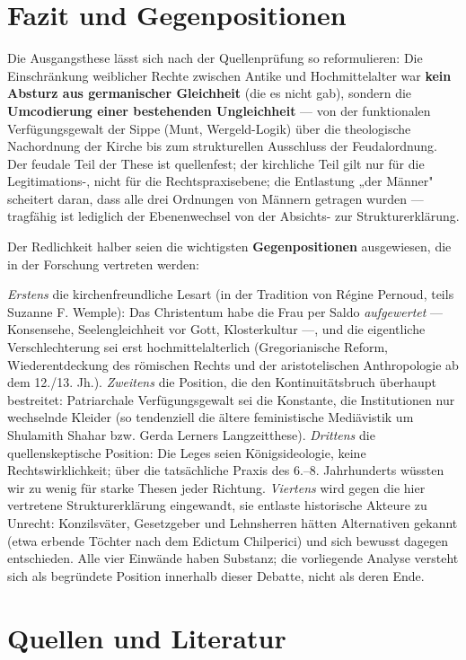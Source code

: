 \documentclass[11pt,a4paper,ngerman]{scrartcl}
\begin{document}
\section{Fazit und Gegenpositionen}

Die Ausgangsthese lässt sich nach der Quellenprüfung so reformulieren: Die Einschränkung weiblicher Rechte zwischen Antike und Hochmittelalter war \textbf{kein Absturz aus germanischer Gleichheit} (die es nicht gab), sondern die \textbf{Umcodierung einer bestehenden Ungleichheit} — von der funktionalen Verfügungsgewalt der Sippe (Munt, Wergeld-Logik) über die theologische Nachordnung der Kirche bis zum strukturellen Ausschluss der Feudalordnung. Der feudale Teil der These ist quellenfest; der kirchliche Teil gilt nur für die Legitimations-, nicht für die Rechtspraxisebene; die Entlastung „der Männer" scheitert daran, dass alle drei Ordnungen von Männern getragen wurden — tragfähig ist lediglich der Ebenenwechsel von der Absichts- zur Strukturerklärung.

Der Redlichkeit halber seien die wichtigsten \textbf{Gegenpositionen} ausgewiesen, die in der Forschung vertreten werden:

\emph{Erstens} die kirchenfreundliche Lesart (in der Tradition von Régine Pernoud, teils Suzanne F. Wemple): Das Christentum habe die Frau per Saldo \emph{aufgewertet} — Konsensehe, Seelengleichheit vor Gott, Klosterkultur —, und die eigentliche Verschlechterung sei erst hochmittelalterlich (Gregorianische Reform, Wiederentdeckung des römischen Rechts und der aristotelischen Anthropologie ab dem 12./13. Jh.). \emph{Zweitens} die Position, die den Kontinuitätsbruch überhaupt bestreitet: Patriarchale Verfügungsgewalt sei die Konstante, die Institutionen nur wechselnde Kleider (so tendenziell die ältere feministische Mediävistik um Shulamith Shahar bzw. Gerda Lerners Langzeitthese). \emph{Drittens} die quellenskeptische Position: Die Leges seien Königsideologie, keine Rechtswirklichkeit; über die tatsächliche Praxis des 6.–8. Jahrhunderts wüssten wir zu wenig für starke Thesen jeder Richtung. \emph{Viertens} wird gegen die hier vertretene Strukturerklärung eingewandt, sie entlaste historische Akteure zu Unrecht: Konzilsväter, Gesetzgeber und Lehnsherren hätten Alternativen gekannt (etwa erbende Töchter nach dem Edictum Chilperici) und sich bewusst dagegen entschieden. Alle vier Einwände haben Substanz; die vorliegende Analyse versteht sich als begründete Position innerhalb dieser Debatte, nicht als deren Ende.


\section{Quellen und Literatur}
\end{document}
